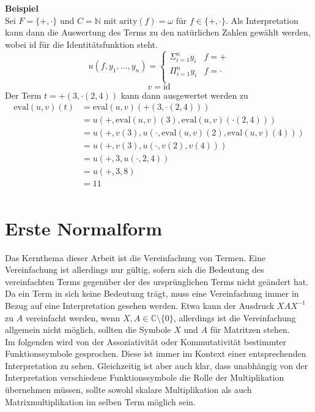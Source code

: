 \documentclass{scrartcl}
\begin{document}
\textbf{Beispiel}\\
Sei $F = \{+, \cdot \}$ und $C = \mathbb{N}$ mit $\mathrm{arity}(f) = \omega$ für $f\in \{+, \cdot \}$.
Als Interpretation kann dann die Auswertung des Terms zu den natürlichen Zahlen gewählt werden, wobei $\mathrm{id}$ für die Identitätsfunktion steht.
$$u(f, y_1, \dots, y_{n}) = \begin{cases}
\Sigma_{i = 1}^{n} y_i & f = +\\
\Pi_{i = 1}^{n} y_i & f = \cdot\\
\end{cases}$$
$$v = \mathrm{id}$$
Der Term $t = +(3, \cdot(2, 4))$ kann dann ausgewertet werden zu 
\begin{equation*}
    \begin{split}
    \mathrm{eval}(u, v)(t) &= \mathrm{eval}(u, v)(+(3, \cdot(2, 4))) \\
    &= u(+, \mathrm{eval}(u, v)(3), \mathrm{eval}(u, v)(\cdot(2, 4))) \\
    &= u(+, v(3), u(\cdot, \mathrm{eval}(u, v)(2), \mathrm{eval}(u, v)(4))) \\
    &= u(+, v(3), u(\cdot, v(2), v(4))) \\
    &= u(+, 3, u(\cdot, 2, 4)) \\
    &= u(+, 3, 8) \\
    &= 11 \\
    \end{split}
\end{equation*}

\section {Erste Normalform}

Das Kernthema dieser Arbeit ist die Vereinfachung von Termen. Eine Vereinfachung ist allerdings nur gültig, sofern sich die Bedeutung des vereinfachten Terms gegenüber der des ursprünglichen Terms nicht geändert hat. Da ein Term in sich keine Bedeutung trägt, muss eine Vereinfachung immer in Bezug auf eine Interpretation gesehen werden. Etwa kann der Ausdruck $X A X^{-1}$ zu $A$ vereinfacht werden, wenn $X, A \in \mathbb{C} \setminus \{0\}$, allerdings ist die Vereinfachung allgemein nicht möglich, sollten die Symbole $X$ und $A$ für Matritzen stehen. \\
Im folgenden wird von der Assoziativität oder Kommutativität bestimmter Funktionssymbole gesprochen. Diese ist immer im Kontext einer entsprechenden Interpretation zu sehen. Gleichzeitig ist aber auch klar, dass unabhängig von der Interpretation verschiedene Funktionssymbole die Rolle der Multiplikation übernehmen müssen, sollte sowohl skalare Multiplikation als auch Matrixmultiplikation im selben Term möglich sein. \\
\end{document}
